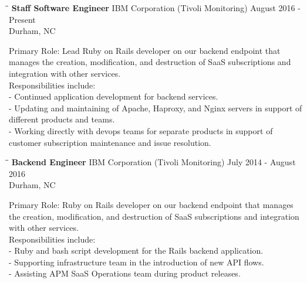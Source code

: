 \documentclass[8pt]{res}
\begin{document}
\begin{resume}
    \begin{tabbing}
      \hspace{2.3in}\= \hspace{2.6in}\= \kill %
      \textbf{Staff Software Engineer} \>IBM Corporation (Tivoli Monitoring) \>August 2016 - Present\\ \>Durham, NC
    \end{tabbing}\vspace{-20pt}      %
    Primary Role: Lead Ruby on Rails developer on our backend endpoint that manages the creation, modification, and destruction of SaaS subscriptions and integration with other services.\\
    Responsibilities include:\\
    - Continued application development for backend services.\\
    - Updating and maintaining of Apache, Haproxy, and Nginx servers in support of different products and teams.\\
    - Working directly with devops teams for separate products in support of customer subscription maintenance and issue resolution.
    \begin{tabbing}
      \hspace{2.3in}\= \hspace{2.6in}\= \kill %
      \textbf{Backend Engineer} \>IBM Corporation (Tivoli Monitoring) \>July 2014 - August 2016\\ \>Durham, NC
    \end{tabbing}\vspace{-20pt}      %
    Primary Role: Ruby on Rails developer on our backend endpoint that manages the creation, modification, and destruction of SaaS subscriptions and integration with other services.\\
    Responsibilities include:\\
    - Ruby and bash script development for the Rails backend application.\\
    - Supporting infrastructure team in the introduction of new API flows.\\
    - Assisting APM SaaS Operations team during product releases.

\end{resume}
\end{document}
